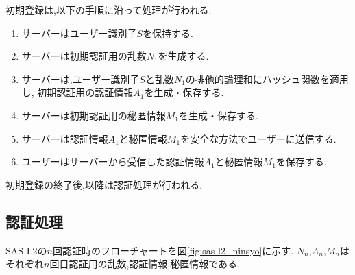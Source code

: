 初期登録は,以下の手順に沿って処理が行われる.
\begin{enumerate}
	\item サーバーはユーザー識別子$S$を保持する.
	\item サーバーは初期認証用の乱数$N_1$を生成する.
	\item サーバーは,ユーザー識別子$S$と乱数$N_1$の排他的論理和にハッシュ関数を適用し,
	初期認証用の認証情報$A_1$を生成・保存する.
	\item サーバーは初期認証用の秘匿情報$M_1$を生成・保存する.
	\item サーバーは認証情報$A_1$と秘匿情報$M_1$を安全な方法でユーザーに送信する.
	\item ユーザーはサーバーから受信した認証情報$A_1$と秘匿情報$M_1$を保存する.
\end{enumerate}
初期登録の終了後,以降は認証処理が行われる.

\subsection {認証処理}
SAS-L2の$n$回認証時のフローチャートを図\ref{fig:sas-l2_ninsyo}に示す.
$N_n$,$A_n$,$M_n$はそれぞれ$n$回目認証用の乱数,認証情報,秘匿情報である.

